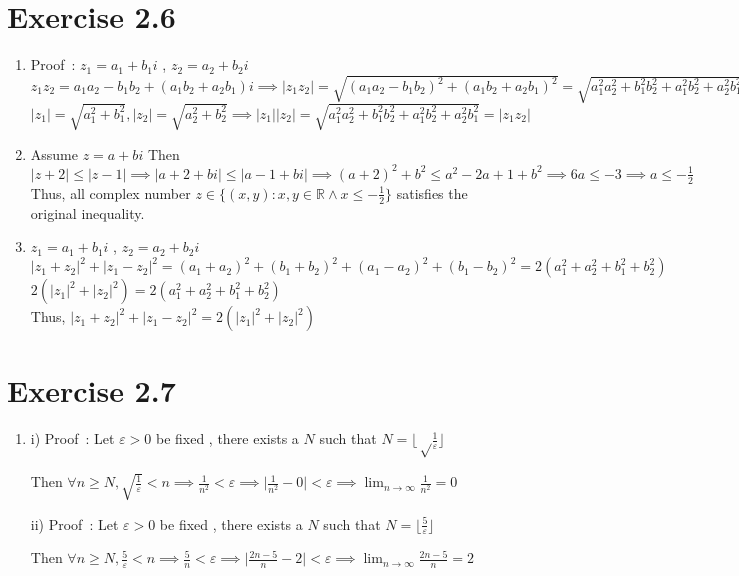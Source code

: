 \documentclass{article}
\begin{document}
\section{Exercise 2.6}
\begin{enumerate}
	\item Proof\ : $z_1=a_1+b_1 i$ , $z_2=a_2+b_2 i$\\
	 $z_1 z_2 =a_1 a_2-b_1 b_2 +(a_1 b_2 +a_2 b_1 )i \implies \lvert z_1 z_2\rvert=\sqrt{(a_1 a_2 - b_1 b_2 )^2+(a_1 b_2 +a_2 b_1)^2} =\sqrt{a_1^2 a_2^2 +b_1^2 b_2^2 +a_1^2 b_2^2 +a_2^2 b_1^2} $\\
	 $\lvert z_1 \rvert =\sqrt{a_1^2+b_1^2} ,  \lvert z_2 \rvert =\sqrt{a_2^2+b_2^2} \implies \lvert z_1 \rvert \lvert z_2 \rvert =\sqrt{a_1^2 a_2^2 +b_1^2 b_2^2 +a_1^2 b_2^2 +a_2^2 b_1^2}=\lvert z_1 z_2\rvert $
	 
	 \item Assume $z=a+bi $ Then $ \lvert z+2 \rvert \leq \lvert z-1 \rvert \implies \lvert a+2+bi\rvert \leq \lvert a-1+bi \rvert \implies (a+2)^2+b^2 \leq a^2 -2a+1+b^2 \implies 6a \leq -3 \implies a \leq - \frac{1}{2}	$ Thus, all complex number $z \in \{ (x,y):x,y \in \mathbb{R} \wedge x \leq - \frac{1}{2} \}$ satisfies the original inequality.
	 
	 \item $z_1=a_1+b_1 i$ , $z_2=a_2+b_2 i$\\
	 $ \lvert z_1 + z_2 \rvert ^2 +\lvert z_1 - z_2 \rvert ^2 = (a_1+a_2)^2+(b_1+b_2)^2+(a_1-a_2)^2+(b_1-b_2)^2 =2(a_1^2+a_2^2+b_1^2+b_2^2)$\\
	 $2(\lvert z_1 \rvert ^2 +\lvert z_2 \rvert ^2 )=2(a_1^2+a_2^2+b_1^2+b_2^2)$\\
	 Thus, $ \lvert z_1 + z_2 \rvert ^2 +\lvert z_1 - z_2 \rvert ^2 = 2(\lvert z_1 \rvert ^2 +\lvert z_2 \rvert ^2 )$
\end{enumerate}

\section{Exercise 2.7}
\begin{enumerate}
	\item i) Proof\ : Let $\varepsilon >0$ be fixed , there exists a $N$ such that $N=\lfloor \sqrt\frac{1}{\varepsilon} \rfloor$ 
	
	Then $\forall n\geq N , \sqrt{\frac{1}{\varepsilon}}<n \implies \frac{1}{n^2}<\varepsilon \implies \vert\frac{1}{n^2}-0 \vert <\varepsilon \implies \lim_{n\to\infty}  \frac{1}{n^2}=0	$
	
 ii) Proof\ : Let $\varepsilon >0$ be fixed , there exists a $N$ such that $N=\lfloor \frac{5}{\varepsilon} \rfloor$ 

Then $\forall n\geq N , \frac{5}{\varepsilon}<n \implies \frac{5}{n}<\varepsilon \implies \vert\frac{2n-5}{n}-2 \vert <\varepsilon \implies \lim_{n\to\infty}  \frac{2n-5}{n}=2	$


\end{enumerate}
\end{document}

